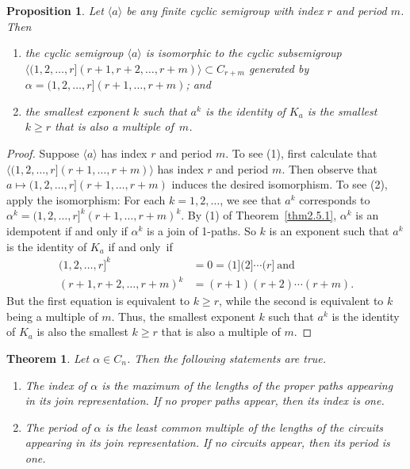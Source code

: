 \documentclass{surv-l}
\numberwithin{equation}{section}
\numberwithin{table}{section}
\numberwithin{figure}{section}
\newtheorem{theorem}[equation]{Theorem}
\newtheorem{proposition}[equation]{Proposition}
\theoremstyle{definition}
\begin{document}
\setcounter{equation}{1}
\begin{proposition}\label{prop2.6.2}
Let $\langle a \rangle$ be any finite cyclic semigroup with index
$r$ and period $m$. Then
\begin{enumerate}
 \item[(1)] the cyclic semigroup $\langle a\rangle$ is
isomorphic to the cyclic subsemigroup $\langle
(1,2,\ldots,r](r+1,r+2,\ldots, r+m)\rangle\subset C_{r+m}$
generated by $\alpha= (1,2,\ldots, r](r+1,\ldots, r+m)$; and

 \item[(2)] the smallest exponent $k$ such that $a^{k}$
is the identity of $K_{a}$ is the smallest $k\geq r$ that is
also a multiple of~$m$.
\end{enumerate}
\end{proposition}

\begin{proof} Suppose $\langle a\rangle$ has index $r$ and period $m$. To see
(1), first calculate that $\langle(1,2,\ldots,  r](r+1,\ldots,
r+m)\rangle$ has index $r$ and period $m$. Then observe that
$a\mapsto(1,2,\ldots, r](r+1,\ldots, r+m)$ induces the desired
isomorphism. To see (2), apply the isomorphism: For each
$k=1,2,\ldots$, we see that $a^{k}$ corresponds to
$\alpha^{k}=(1,2,\ldots, r]^{k}(r+1,\ldots,r+m)^{k}$. By (1) of
Theorem~\ref{thm2.5.1}, $\alpha^{k}$ is an idempotent if and only
if $\alpha^{k}$ is a join of 1-paths. So $k$ is an exponent such
that $a^{k}$ is the identity of $K_{a}$ if and only~if
\begin{align*}
(1, 2,\ldots,r]^{k}&=0=(1](2]\cdots(r]\ \mathrm{and}\\
(r+1,r+2,\ldots, r+m)^{k}&=(r+1)(r+2)\cdots(r+m).
\end{align*}
But the first equation is equivalent to $k\geq r$, while the
second is equivalent to $k$ being a multiple of $m$. Thus, the
smallest exponent $k$ such that $a^{k}$ is the identity of $K_{a}$
is also the smallest $k\geq r$ that is also a multiple of $m$.
\end{proof}

\begin{theorem}\label{thm2.6.3}
Let $\alpha\in C_{n}$. Then the following statements are true.
\begin{enumerate}
\item[(1)] The index of $\alpha$ is the maximum of the
lengths of the proper paths appearing in its join
representation. If no proper paths appear, then its index is one.

\item[(2)] The period of $\alpha$ is the least common
multiple of the lengths of the circuits appearing in its join
representation. If no circuits appear, then its period is one.
\end{enumerate}
\end{theorem}
\end{document}
